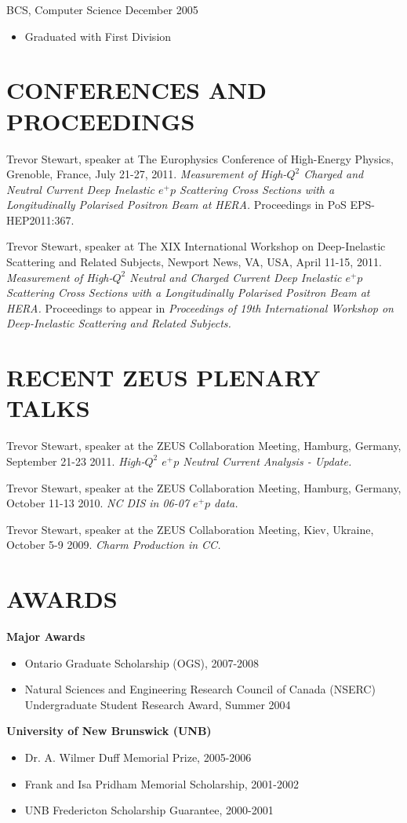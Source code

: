 \documentclass[margin]{res}
\begin{document}
\begin{resume}
BCS, Computer Science \hfill December 2005
\begin{itemize} \itemsep -2pt  %
\item Graduated with First Division 
\end{itemize}

\section{CONFERENCES AND PROCEEDINGS}

Trevor Stewart, speaker at The Europhysics Conference of High-Energy Physics, Grenoble, France, July 21-27, 2011. \textit{Measurement of High-$Q^2$ Charged and Neutral Current Deep Inelastic $e^{+}p$ Scattering Cross Sections with a Longitudinally Polarised Positron Beam at HERA.} Proceedings in PoS EPS-HEP2011:367.

Trevor Stewart, speaker at The XIX International Workshop on Deep-Inelastic Scattering and Related Subjects, Newport News, VA, USA, April 11-15, 2011. \textit{Measurement of High-$Q^2$ Neutral and Charged Current Deep Inelastic $e^+p$ Scattering Cross Sections with a Longitudinally Polarised Positron Beam at HERA.} Proceedings to 
appear in \textit{Proceedings of 19th International Workshop on Deep-Inelastic Scattering and Related Subjects.}  

\section{RECENT ZEUS PLENARY TALKS}

Trevor Stewart, speaker at the ZEUS Collaboration Meeting, Hamburg, Germany, September 21-23 2011. \textit{High-$Q^2$ $e^{+}p$ Neutral Current Analysis - Update.}  

Trevor Stewart, speaker at the ZEUS Collaboration Meeting, Hamburg, Germany, October 11-13 2010.  \textit{NC DIS in 06-07 $e^{+}p$ data.} 

Trevor Stewart, speaker at the ZEUS Collaboration Meeting, Kiev, Ukraine, October 5-9 2009. \textit{Charm Production in CC.}   

\section{AWARDS}

\textbf{Major Awards}\\
\begin{itemize}
\item Ontario Graduate Scholarship (OGS), 2007-2008
\item Natural Sciences and Engineering Research Council of Canada (NSERC) Undergraduate Student Research Award, Summer 2004
\end{itemize}
\textbf{University of New Brunswick (UNB)}\\
\begin{itemize}
\item Dr. A. Wilmer Duff Memorial Prize, 2005-2006
\item Frank and  Isa  Pridham Memorial Scholarship, 2001-2002
\item UNB Fredericton Scholarship Guarantee, 2000-2001
\end{itemize}


\end{resume}
\end{document}
